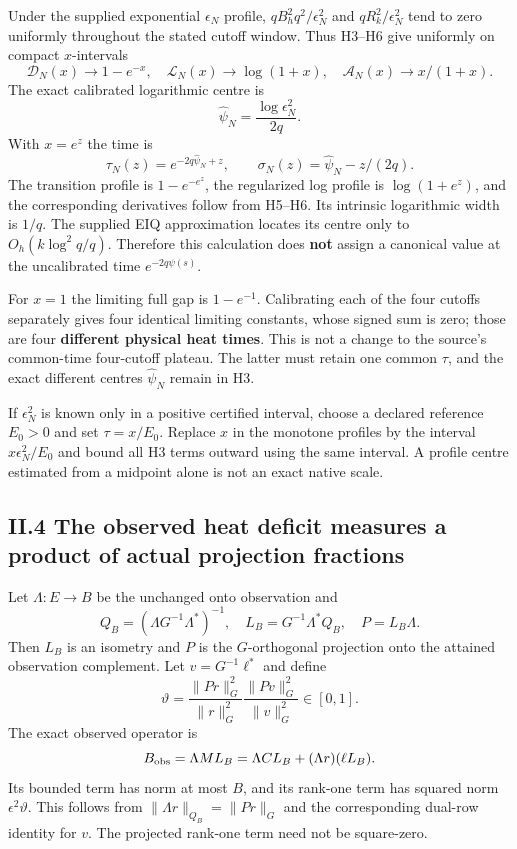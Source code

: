 Under the supplied exponential \(\epsilon_N\) profile, \(qB_h^2q^2/\epsilon_N^2\) and \(qR_k^2/\epsilon_N^2\) tend to zero uniformly throughout the stated cutoff window. Thus H3--H6 give uniformly on compact \(x\)-intervals \[
 \mathcal D_N(x)\to1-e^{-x},\quad
 \mathcal L_N(x)\to\log(1+x),\quad
 \mathcal A_N(x)\to x/(1+x).
 \tag{H7}
\] The exact calibrated logarithmic centre is \[
 \widehat\psi_N=\frac{\log\epsilon_N^2}{2q}.
\] With \(x=e^z\) the time is \[
 \tau_N(z)=e^{-2q\widehat\psi_N+z},\qquad
 \sigma_N(z)=\widehat\psi_N-z/(2q).
\] The transition profile is \(1-e^{-e^z}\), the regularized log profile is \(\log(1+e^z)\), and the corresponding derivatives follow from H5--H6. Its intrinsic logarithmic width is \(1/q\). The supplied EIQ approximation locates its centre only to \(O_h(k\log^2q/q)\). Therefore this calculation does \textbf{not} assign a canonical value at the uncalibrated time \(e^{-2q\psi(s)}\).

For \(x=1\) the limiting full gap is \(1-e^{-1}\). Calibrating each of the four cutoffs separately gives four identical limiting constants, whose signed sum is zero; those are four \textbf{different physical heat times}. This is not a change to the source's common-time four-cutoff plateau. The latter must retain one common \(\tau\), and the exact different centres \(\widehat\psi_N\) remain in H3.

If \(\epsilon_N^2\) is known only in a positive certified interval, choose a declared reference \(E_0>0\) and set \(\tau=x/E_0\). Replace \(x\) in the monotone profiles by the interval \(x\epsilon_N^2/E_0\) and bound all H3 terms outward using the same interval. A profile centre estimated from a midpoint alone is not an exact native scale.

\subsection{II.4 The observed heat deficit measures a product of actual projection fractions}\label{ii.4-the-observed-heat-deficit-measures-a-product-of-actual-projection-fractions}

Let \(\Lambda:E\to B\) be the unchanged onto observation and \[
 Q_B=(\Lambda G^{-1}\Lambda^*)^{-1},\quad
 L_B=G^{-1}\Lambda^*Q_B,\quad P=L_B\Lambda.
\] Then \(L_B\) is an isometry and \(P\) is the \(G\)-orthogonal projection onto the attained observation complement. Let \(v=G^{-1}\ell^*\) and define \[
 \vartheta=
 \frac{\|Pr\|_G^2}{\|r\|_G^2}
 \frac{\|Pv\|_G^2}{\|v\|_G^2}\in[0,1].
 \tag{H8}
\] The exact observed operator is \[
 B_{\rm obs}=\Lambda ML_B=\Lambda CL_B+(\Lambda r)(\ell L_B).
\] Its bounded term has norm at most \(B\), and its rank-one term has squared norm \(\epsilon^2\vartheta\). This follows from \(\|\Lambda r\|_{Q_B}=\|Pr\|_G\) and the corresponding dual-row identity for \(v\). The projected rank-one term need not be square-zero.

